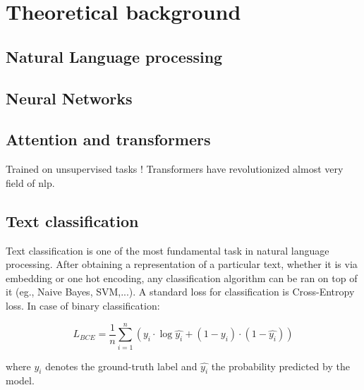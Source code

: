 \chapter{Theoretical background}

\section{Natural Language processing}

\section{Neural Networks}

\section{Attention and transformers}\label{att_transformers}
Trained on unsupervised tasks !
Transformers have revolutionized almost very field of \Gls{nlp}. 

\section{Text classification}
Text classification is one of the most fundamental task in natural language processing. After obtaining a representation of a particular text, whether it is via embedding or one hot encoding, any classification algorithm can be ran on top of it (eg., Naive Bayes, SVM,...). A standard loss for classification is Cross-Entropy loss. In case of binary classification:

\begin{equation}
    L_{BCE} = \frac{1}{n} \sum_{i=1}^n ( y_i \cdot \log\hat{y_i} + (1-y_i)\cdot(1-\hat{y_i}))
\end{equation}

where $y_i$ denotes the ground-truth label and $\hat{y_i}$ the probability predicted by the model. 

    
